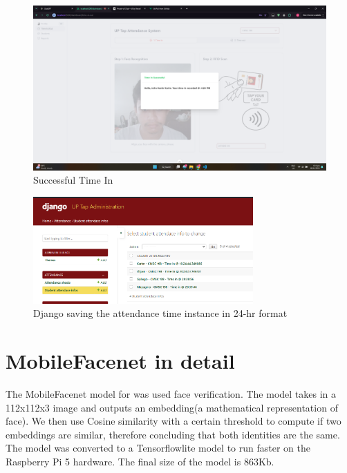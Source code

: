 \begin{figure}[h] %
	\centering
	\includegraphics[width=1.0\textwidth]{figures/chapter4/success.png} %
	\caption{Successful Time In}
	\label{fig:success}
\end{figure}
\begin{figure}[h] %
	\centering
	\includegraphics[width=0.75\textwidth]{figures/chapter4/backendrecord.png} %
	\caption{Django saving the attendance time instance in 24-hr format}
	\label{fig:record}
\end{figure}

\clearpage
\section{MobileFacenet in detail}
The MobileFacenet model for was used face verification. The model takes in a 112x112x3 image and outputs an embedding(a mathematical representation of face). We then use Cosine similarity with a certain threshold to compute if two embeddings are similar, therefore concluding that both identities are the same. The model was converted to a Tensorflowlite model to run faster on the Raspberry Pi 5 hardware. The final size of the model is 863Kb.

